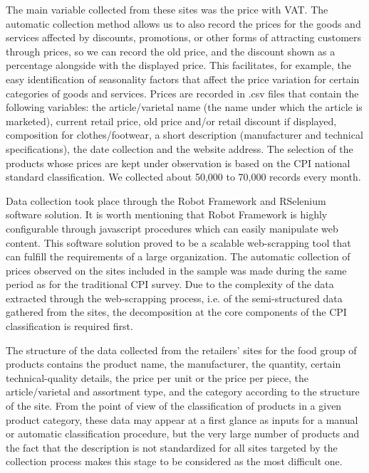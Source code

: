 \documentclass[]{article}
\begin{document}
The main variable collected from these sites was the price with VAT. The automatic collection method allows us to also 
record the prices for the goods and services affected by discounts, promotions, or other forms of attracting customers
through prices, so we can record the old price, and the discount shown as a percentage alongside with the displayed price. 
This facilitates, for example, the easy identification of seasonality factors that affect the price variation for
certain categories of goods and services. Prices are recorded in .csv files that contain the following variables: 
the article/varietal name (the name under which the article is marketed), current retail price, old price and/or 
retail discount if displayed, composition for clothes/footwear, a short description (manufacturer and technical 
specifications), the date collection and the website address. The selection of the products whose prices are kept
under observation is based on the CPI national standard classification. We collected about 50,000 to 70,000 records every month.


Data collection took place through the Robot Framework and RSelenium software solution. It is worth mentioning that Robot Framework is highly configurable through javascript procedures which can easily manipulate web content. This software solution proved to be a scalable web-scrapping tool that can fulfill the requirements of a 
large organization. The automatic collection of prices observed on the sites included in the sample was made during
the same period as for the traditional CPI survey. Due to the complexity of the data extracted through the 
web-scrapping process, i.e. of the semi-structured data gathered from the sites, the decomposition at the 
core components of the CPI classification is required first.


The structure of the data collected from the retailers’ sites for the food group of products contains the product 
name, the manufacturer, the quantity, certain technical-quality details, the price per unit or the price per piece, 
the article/varietal and assortment type, and the category according to the structure of the site. From the point of view 
of the classification of products in a given product category, these data may appear at a first glance 
as inputs for a manual or automatic classification procedure, but the very large number of products and the fact 
that the description is not standardized for all sites targeted by the collection process makes this stage to be considered as the most difficult one.
\end{document}
